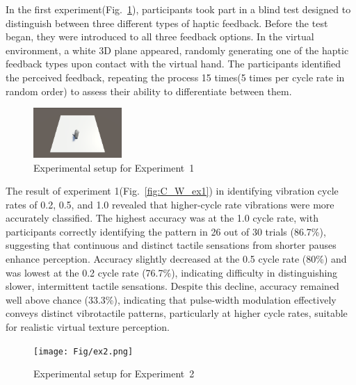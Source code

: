 \documentclass[a4paper,twocolumn]{article}
\begin{document}
In the first experiment(Fig.~\ref{fig:ex1}), participants took part in a blind test designed to distinguish between three different types of haptic feedback. Before the test began, they were introduced to all three feedback options. In the virtual environment, a white 3D plane appeared, randomly generating one of the haptic feedback types upon contact with the virtual hand. The participants identified the perceived feedback, repeating the process 15 times(5 times per cycle rate in random order) to assess their ability to differentiate between them.
\begin{figure}[H]\centering
	\includegraphics[width=0.3\textwidth]{Fig/ex1.png}%
	\caption{Experimental setup for Experiment~1}\label{fig:ex1}%
\end{figure}


The result of experiment 1(Fig.~\ref{fig:C_W_ex1}) in identifying vibration cycle rates of 0.2, 0.5, and 1.0 revealed that higher-cycle rate vibrations were more accurately classified. The highest accuracy was at the 1.0 cycle rate, with participants correctly identifying the pattern in 26 out of 30 trials (86.7\%), suggesting that continuous and distinct tactile sensations from shorter pauses enhance perception. Accuracy slightly decreased at the 0.5 cycle rate (80\%) and was lowest at the 0.2 cycle rate (76.7\%), indicating difficulty in distinguishing slower, intermittent tactile sensations. Despite this decline, accuracy remained well above chance (33.3\%), indicating that pulse-width modulation effectively conveys distinct vibrotactile patterns, particularly at higher cycle rates, suitable for realistic virtual texture perception.
\begin{figure}[H]\centering
	\texttt{[image: Fig/ex2.png]}%
	\caption{Experimental setup for Experiment~2}\label{fig:ex2}%
\end{figure}

\end{document}
